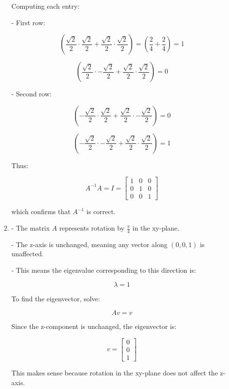\documentclass[12pt]{article}
\begin{document}
\begin{enumerate}
\begin{enumerate}
    Computing each entry:

    - First row:
    
      \[
      \left(\frac{\sqrt{2}}{2} \cdot \frac{\sqrt{2}}{2} + \frac{\sqrt{2}}{2} \cdot \frac{\sqrt{2}}{2} \right) = \left(\frac{2}{4} + \frac{2}{4}\right) = 1
      \]
    
      \[
      \left(\frac{\sqrt{2}}{2} \cdot -\frac{\sqrt{2}}{2} + \frac{\sqrt{2}}{2} \cdot \frac{\sqrt{2}}{2} \right) = 0
      \]

    - Second row:

      \[
      \left(-\frac{\sqrt{2}}{2} \cdot \frac{\sqrt{2}}{2} + \frac{\sqrt{2}}{2} \cdot -\frac{\sqrt{2}}{2} \right) = 0
      \]

      \[
      \left(-\frac{\sqrt{2}}{2} \cdot -\frac{\sqrt{2}}{2} + \frac{\sqrt{2}}{2} \cdot \frac{\sqrt{2}}{2} \right) = 1
      \]

    Thus:

    \[
    A^{-1} A = I =
    \begin{bmatrix}
    1 & 0 & 0 \\
    0 & 1 & 0 \\
    0 & 0 & 1
    \end{bmatrix}
    \]

    which confirms that \( A^{-1} \) is correct.

    \item
    
    - The matrix \( A \) represents rotation by \( \frac{\pi}{4} \) in the xy-plane.
    
    - The z-axis is unchanged, meaning any vector along \( (0,0,1) \) is unaffected.
    
    - This means the eigenvalue corresponding to this direction is:

    \[
    \lambda = 1
    \]

    To find the eigenvector, solve:

    \[
    A v = v
    \]

    Since the z-component is unchanged, the eigenvector is:

    \[
    v =
    \begin{bmatrix}
    0 \\
    0 \\
    1
    \end{bmatrix}
    \]

    This makes sense because rotation in the xy-plane does not affect the z-axis.

\end{enumerate}


\end{enumerate}
\end{document}
